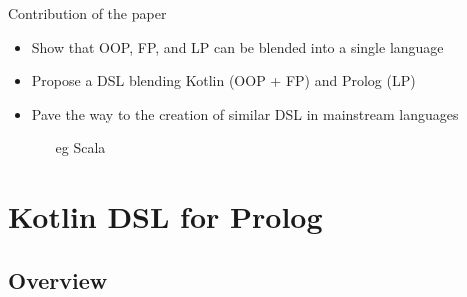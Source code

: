 \documentclass[presentation]{beamer}
\begin{document}
\begin{frame}{Contribution of the paper}

\begin{itemize}
    \item Show that OOP, FP, and LP can be blended into a single language

    \vfill

    \item Propose a DSL blending Kotlin (OOP + FP) and Prolog (LP)
    \\

    \vfill

    \item Pave the way to the creation of similar DSL in mainstream languages
    \begin{itemize}
    	\item[eg] Scala
    \end{itemize}
\end{itemize}

\end{frame}

\section{Kotlin DSL for Prolog}

\subsection{Overview}
\end{document}
